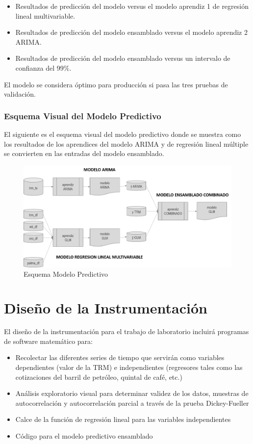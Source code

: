 \begin{itemize}
	\item Resultados de predicción del modelo versus el modelo aprendiz 1 de regresión lineal multivariable.
	\item Resultados de predicción del modelo ensamblado versus el modelo aprendiz 2 ARIMA. 
	\item Resultados de predicción del modelo ensamblado versus un intervalo de confianza del 99\%.
\end{itemize}

El modelo se considera óptimo para producción si pasa las tres pruebas de validación.  

\subsubsection{Esquema Visual del Modelo Predictivo}
El siguiente es el esquema visual del modelo predictivo donde se muestra como los resultados de los aprendices del modelo ARIMA y de regresión lineal múltiple se convierten en las entradas del modelo ensamblado.

\begin{figure}[H]
	\centering
	\includegraphics[width=5in]{images/EsquemaModeloPredictivo.png}	\caption{Esquema Modelo Predictivo}
\end{figure}

\section{Diseño de la Instrumentación}
El diseño de la instrumentación para el trabajo de laboratorio incluirá programas de software matemático para:

\begin{itemize}
    \item Recolectar las diferentes series de tiempo que servirán como variables dependientes (valor de la TRM) e independientes (regresores tales como las cotizaciones del barril de petróleo, quintal de café, etc.)
    \item Análisis exploratorio visual para determinar validez de los datos, muestras de autocorrelación y autocorrelación parcial a través de la prueba Dickey-Fueller
    \item Calce de la función de regresión lineal para las variables independientes
    \item Código para el modelo predictivo ensamblado
\end{itemize}

